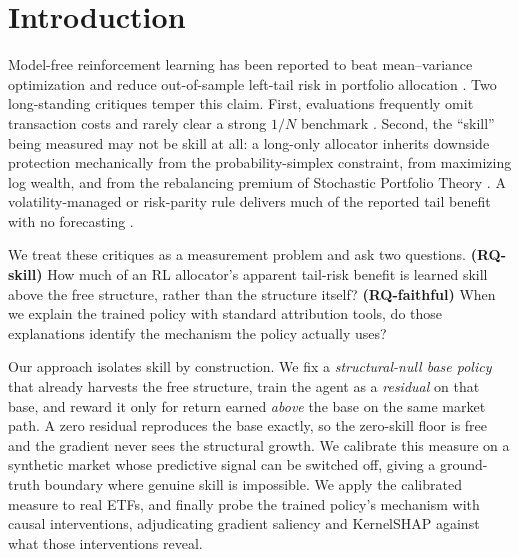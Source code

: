 \documentclass[sigconf,anonymous,review]{acmart}
\begin{document}

\maketitle

\section{Introduction}
Model-free reinforcement learning has been reported to beat mean--variance
optimization and reduce out-of-sample left-tail risk in portfolio allocation
\cite{lavko2023,zhang2020dlportfolio}. Two long-standing critiques temper this
claim. First, evaluations frequently omit transaction costs and rarely clear a
strong $1/N$ benchmark \cite{demiguel2009,kruthof2025}. Second, the ``skill''
being measured may not be skill at all: a long-only allocator inherits downside
protection mechanically from the probability-simplex constraint, from maximizing
log wealth, and from the rebalancing premium of Stochastic Portfolio Theory
\cite{fernholz2002}. A volatility-managed or risk-parity rule delivers much of the
reported tail benefit with no forecasting \cite{moreira2017,maillard2010}.

We treat these critiques as a measurement problem and ask two questions.
\textbf{(RQ-skill)} How much of an RL allocator's apparent tail-risk benefit is
learned skill above the free structure, rather than the structure itself?
\textbf{(RQ-faithful)} When we explain the trained policy with standard
attribution tools, do those explanations identify the mechanism the policy
actually uses?

Our approach isolates skill by construction. We fix a \emph{structural-null base
policy} that already harvests the free structure, train the agent as a
\emph{residual} on that base, and reward it only for return earned \emph{above} the
base on the same market path. A zero residual reproduces the base exactly, so the
zero-skill floor is free and the gradient never sees the structural growth. We
calibrate this measure on a synthetic market whose predictive signal can be
switched off, giving a ground-truth boundary where genuine skill is impossible. We
apply the calibrated measure to real ETFs, and finally probe the trained policy's
mechanism with causal interventions, adjudicating gradient saliency and KernelSHAP
against what those interventions reveal.
\end{document}
